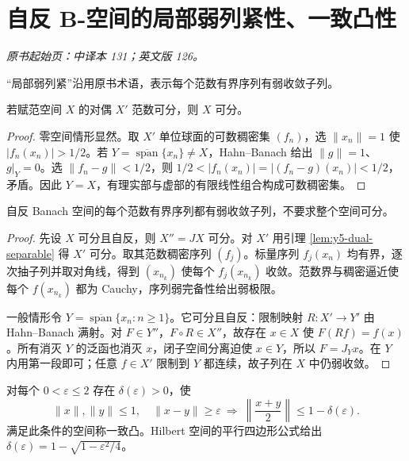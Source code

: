 \section{自反 B-空间的局部弱列紧性、一致凸性}\label{sec:yosida-05-02}
\noindent\textit{原书起始页：中译本 131；英文版 126。}

“局部弱列紧”沿用原书术语，表示每个范数有界序列有弱收敛子列。

\begin{lemma}[对偶可分推出原空间可分]\label{lem:y5-dual-separable}
若赋范空间 $X$ 的对偶 $X'$ 范数可分，则 $X$ 可分。
\end{lemma}
\begin{proof}
零空间情形显然。取 $X'$ 单位球面的可数稠密集 $(f_n)$，选 $\|x_n\|=1$ 使 $|f_n(x_n)|>1/2$。若 $Y=\overline{\operatorname{span}}\{x_n\}\ne X$，Hahn--Banach 给出 $\|g\|=1$、$g|_Y=0$。选 $\|f_n-g\|<1/2$，则 $1/2<|f_n(x_n)|=|(f_n-g)(x_n)|<1/2$，矛盾。因此 $Y=X$，有理实部与虚部的有限线性组合构成可数稠密集。
\end{proof}

\begin{theorem}[自反空间的子列提取]\label{thm:y5-reflexive-sequence}
自反 Banach 空间的每个范数有界序列都有弱收敛子列，不要求整个空间可分。
\end{theorem}
\begin{proof}
先设 $X$ 可分且自反，则 $X''=JX$ 可分。对 $X'$ 用引理 \ref{lem:y5-dual-separable} 得 $X'$ 可分。取其范数稠密序列 $(f_j)$。标量序列 $f_j(x_n)$ 均有界，逐次抽子列并取对角线，得到 $(x_{n_k})$ 使每个 $f_j(x_{n_k})$ 收敛。范数界与稠密逼近使每个 $f(x_{n_k})$ 都为 Cauchy，序列弱完备性给出弱极限。

一般情形令 $Y=\overline{\operatorname{span}}\{x_n:n\ge1\}$。它可分且自反：限制映射 $R:X'\to Y'$ 由 Hahn--Banach 满射。对 $F\in Y''$，$F\circ R\in X''$，故存在 $x\in X$ 使 $F(Rf)=f(x)$。所有消灭 $Y$ 的泛函也消灭 $x$，闭子空间分离迫使 $x\in Y$，所以 $F=J_Yx$。在 $Y$ 内用第一段即可；任意 $f\in X'$ 限制到 $Y$ 都连续，故子列在 $X$ 中仍弱收敛。
\end{proof}

\begin{definition}[一致凸性]
对每个 $0<\varepsilon\le2$ 存在 $\delta(\varepsilon)>0$，使
\[
 \|x\|,\|y\|\le1,\quad\|x-y\|\ge\varepsilon
 \ \Longrightarrow\ \left\|\frac{x+y}{2}\right\|\le1-\delta(\varepsilon).
\]
满足此条件的空间称一致凸。Hilbert 空间的平行四边形公式给出 $\delta(\varepsilon)=1-\sqrt{1-\varepsilon^2/4}$。
\end{definition}

